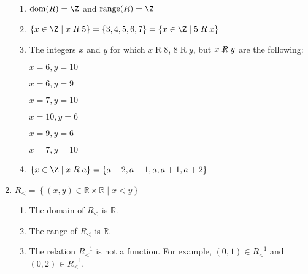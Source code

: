 \begin{enumerate}
\begin{enumerate}
\item $\text{dom}(R) = \Z$ and $\text{range}(R) = \Z$

\item $\{ x \in \Z \mid x \mathrel{R} 5 \} = \{3, 4, 5, 6, 7 \} = \{ x \in \Z \mid 5 \mathrel{R} x \}$

\item The integers $x$ and $y$ for which $x \mathrel{R} 8$, $8 \mathrel{R} y$, but 
$x \mathrel{\not \negthickspace R} y$ are the following: 

\begin{multicols}{3}
$x = 6, y = 10$

$x = 6, y = 9$
 
$x = 7, y = 10$

$x = 10, y = 6$

$x = 9, y = 6$

$x = 7, y = 10$
\end{multicols}

\item $\{ x \in \Z \mid x \mathrel{R} a \} = \{a - 2, a - 1, a, a + 1, a + 2 \}$
\end{enumerate}



\item $R_{  < }  = \left\{ { {\left( {x, y} \right) \in \mathbb{R} \times \mathbb{R} } \mid x < y} \right\}$
\begin{enumerate}
\item The domain of $R_{  < }$ is $\mathbb{R}$.

\item The range of $R_{  < }$ is $\mathbb{R}$.


\item The relation $R_{<}^{-1}$ is not a function.  For example, 
$\left( 0, 1 \right) \in R_{<}^{-1}$ and $\left( 0, 2 \right) \in R_{<}^{-1}$.
\end{enumerate}

%

\end{enumerate}




